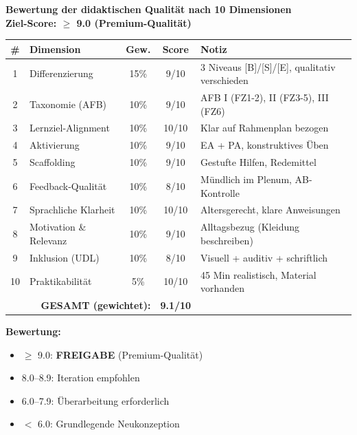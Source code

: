 \documentclass[11pt,a4paper]{article}
\begin{document}
\begin{scorebox}
\textbf{Bewertung der didaktischen Qualität nach 10 Dimensionen}\\
\textbf{Ziel-Score: $\geq$ 9.0 (Premium-Qualität)}

\vspace{1em}
\begin{tabular}{|c|l|c|c|p{4.5cm}|}
\hline
\textbf{\#} & \textbf{Dimension} & \textbf{Gew.} & \textbf{Score} & \textbf{Notiz} \\
\hline
1 & Differenzierung & 15\% & 9/10 & 3 Niveaus [B]/[S]/[E], qualitativ verschieden \\
\hline
2 & Taxonomie (AFB) & 10\% & 9/10 & AFB I (FZ1-2), II (FZ3-5), III (FZ6) \\
\hline
3 & Lernziel-Alignment & 10\% & 10/10 & Klar auf Rahmenplan bezogen \\
\hline
4 & Aktivierung & 10\% & 9/10 & EA + PA, konstruktives Üben \\
\hline
5 & Scaffolding & 10\% & 9/10 & Gestufte Hilfen, Redemittel \\
\hline
6 & Feedback-Qualität & 10\% & 8/10 & Mündlich im Plenum, AB-Kontrolle \\
\hline
7 & Sprachliche Klarheit & 10\% & 10/10 & Altersgerecht, klare Anweisungen \\
\hline
8 & Motivation \& Relevanz & 10\% & 9/10 & Alltagsbezug (Kleidung beschreiben) \\
\hline
9 & Inklusion (UDL) & 10\% & 8/10 & Visuell + auditiv + schriftlich \\
\hline
10 & Praktikabilität & 5\% & 10/10 & 45 Min realistisch, Material vorhanden \\
\hline
\multicolumn{3}{|r|}{\textbf{GESAMT (gewichtet):}} & \textbf{9.1/10} & \\
\hline
\end{tabular}

\vspace{1em}
\textbf{Bewertung:}
\begin{itemize}
    \item[$\boxtimes$] \textcolor{successgreen}{$\geq$ 9.0: \textbf{FREIGABE} (Premium-Qualität)}
    \item[$\Box$] \textcolor{warningorange}{8.0--8.9: Iteration empfohlen}
    \item[$\Box$] 6.0--7.9: Überarbeitung erforderlich
    \item[$\Box$] $<$ 6.0: Grundlegende Neukonzeption
\end{itemize}


\end{scorebox}
\end{document}

